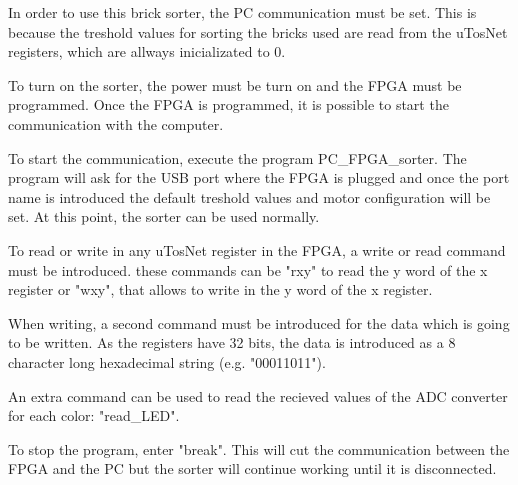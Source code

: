 
In order to use this brick sorter, the PC communication must be set. This is because the treshold values for sorting the bricks used are read from the uTosNet registers, which are allways inicializated to 0.

To turn on the sorter, the power must be turn on and the FPGA must be programmed.
Once the FPGA is programmed, it is possible to start the communication with the computer.

To start the communication, execute the program PC\_FPGA\_sorter. The program will ask for the USB port where the FPGA is plugged and once the port name is introduced the default treshold values and motor configuration will be set. At this point, the sorter can be used normally.

To read or write in any uTosNet register in the FPGA, a write or read command must be introduced. these commands can be "rxy" to read the y word of the x register or "wxy", that allows to write in the y word of the x register.

When writing, a second command must be introduced for the data which is going to be written. As the registers have 32 bits, the data is introduced as a 8 character long hexadecimal string (e.g. "00011011").

An extra command can be used to read the recieved values of the ADC converter for each color: "read\_LED".

To stop the program, enter "break". This will cut the communication between the FPGA and the PC but the sorter will continue working until it is disconnected.



